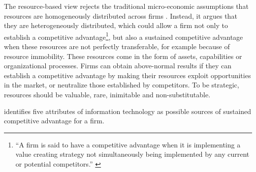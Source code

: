 \documentclass[12pt]{article}
\begin{document}
The resource-based view rejects the traditional micro-economic
assumptions that resources are homogeneously distributed across firms
\citep[ 99-103]{barney1991}. Instead, it argues that they are
heterogeneously distributed, which could allow a firm not only to
establish a competitive advantage\footnote{``A firm is said to have a
  competitive advantage when it is implementing a value creating
  strategy not simultaneously being implemented by any current or
  potential competitors.'' \citep[ 102]{barney1991}}, but also a
sustained competitive advantage when these resources are not perfectly
transferable, for example because of resource immobility. These
resources come in the form of assets, capabilities or organizational
processes. Firms can obtain above-normal results if they can establish a
competitive advantage by making their resources exploit opportunities in
the market, or neutralize those established by competitors. To be
strategic, resources should be valuable, rare, inimitable and
non-substitutable.

\citet[495-500]{mata1995} identifies five attributes of information
technology as possible sources of sustained competitive advantage for a
firm.
\end{document}
